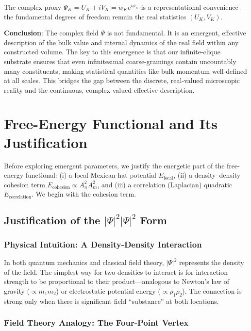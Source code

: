\documentclass[11pt]{article}
\begin{document}
The complex proxy $\Psi_K = U_K + iV_K = w_K e^{i\phi_K}$ is a representational convenience—the fundamental degrees of freedom remain the real statistics $(U_K, V_K)$.

\textbf{Conclusion}: The complex field $\Psi$ is not fundamental. It is an emergent, effective description of the bulk value and internal dynamics of the real field within any constructed volume. The key to this emergence is that our infinite-clique substrate ensures that even infinitesimal coarse-grainings contain uncountably many constituents, making statistical quantities like bulk momentum well-defined at all scales. This bridges the gap between the discrete, real-valued microscopic reality and the continuous, complex-valued effective description.

\section{Free-Energy Functional and Its Justification}

Before exploring emergent parameters, we justify the energetic part of the free-energy functional: (i) a local Mexican-hat potential $E_{\text{local}}$, (ii) a density–density cohesion term $E_{\text{cohesion}}\propto A_n^2A_m^2$, and (iii) a correlation (Laplacian) quadratic $E_{\text{correlation}}$. We begin with the cohesion term.

\subsection{Justification of the $|\Psi|^2|\Psi|^2$ Form}

\subsubsection{Physical Intuition: A Density-Density Interaction}

In both quantum mechanics and classical field theory, $|\Psi|^2$ represents the density of the field. The simplest way for two densities to interact is for interaction strength to be proportional to their product—analogous to Newton's law of gravity ($\propto m_1m_2$) or electrostatic potential energy ($\propto \rho_1\rho_2$). The connection is strong only when there is significant field ``substance'' at both locations.

\subsubsection{Field Theory Analogy: The Four-Point Vertex}
\end{document}
